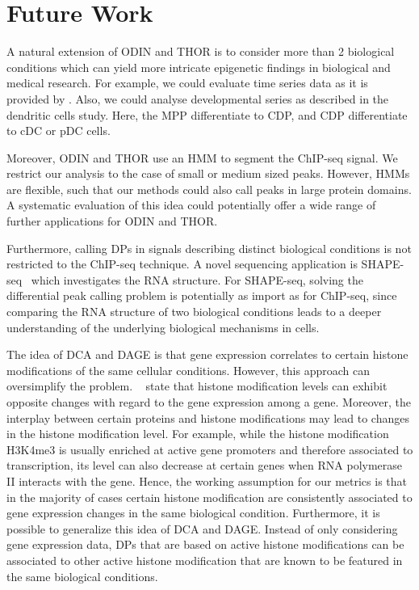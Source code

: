 \section{Future Work}

A natural extension of ODIN and THOR is to consider more than 2 biological conditions which can yield more intricate epigenetic findings in biological and medical research.
For example, we could evaluate time series data as it is provided by \cite{kaikonnen2013}.
Also, we could analyse developmental series as described in the dendritic cells study.
Here, the MPP differentiate to CDP, and CDP differentiate to cDC or pDC cells.

Moreover, ODIN and THOR use an HMM to segment the ChIP-seq signal.
We restrict our analysis to the case of small or medium sized peaks.
However, HMMs are flexible, such that our methods could also call peaks in large protein domains.
A systematic evaluation of this idea could potentially offer a wide range of further applications for ODIN and THOR.

Furthermore, calling DPs in signals describing distinct biological conditions is not restricted to the ChIP-seq technique.
A novel sequencing application is SHAPE-seq~\citep{Lucks2011, Loughrey2014} which investigates the RNA structure.
For SHAPE-seq, solving the differential peak calling problem is potentially as import as for ChIP-seq, since comparing the RNA structure of two biological conditions leads to a deeper understanding of the underlying biological mechanisms in cells.

The idea of DCA and DAGE is that gene expression correlates to certain histone modifications of the same cellular conditions.
However, this approach can oversimplify the problem.
~\cite{Maze2014} state that histone modification levels can exhibit opposite changes with regard to the gene expression among a gene.
Moreover, the interplay between certain proteins and histone modifications may lead to changes in the histone modification level. 
For example, while the histone modification H3K4me3 is usually enriched at active gene promoters and therefore associated to transcription, its level can also decrease at certain genes when RNA polymerase II interacts with the gene.
Hence, the working assumption for our metrics is that in the majority of cases certain histone modification are consistently associated to gene expression changes in the same biological condition.
Furthermore, it is possible to generalize this idea of DCA and DAGE.
Instead of only considering gene expression data, DPs that are based on active histone modifications can be associated to other active histone modification that are known to be featured in the same biological conditions.

